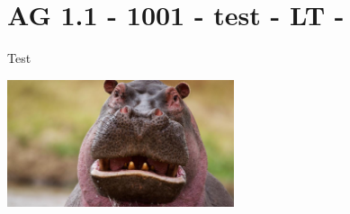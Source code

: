 \section{AG 1.1 - 1001 - test - LT - }

\begin{beispiel}[AG 1.1]{1}
Test

\includegraphics[width=0.5\textwidth]{../_database_inoffiziell/Bilder/AG11_1001_hippo.eps}
\end{beispiel}
